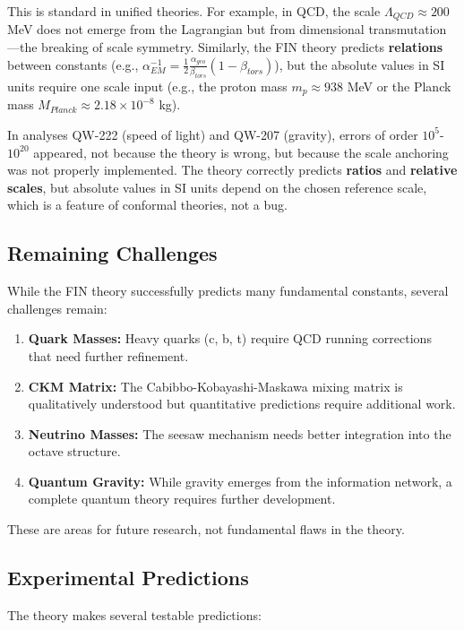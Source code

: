 \documentclass[11pt, a4paper]{article}
\begin{document}
This is standard in unified theories. For example, in QCD, the scale $\Lambda_{QCD} \approx 200$ MeV does not emerge from the Lagrangian but from dimensional transmutation—the breaking of scale symmetry. Similarly, the FIN theory predicts \textbf{relations} between constants (e.g., $\alpha_{EM}^{-1} = \frac{1}{2}\frac{\alpha_{geo}}{\beta_{tors}}(1-\beta_{tors})$), but the absolute values in SI units require one scale input (e.g., the proton mass $m_p \approx 938$ MeV or the Planck mass $M_{Planck} \approx 2.18 \times 10^{-8}$ kg).

In analyses QW-222 (speed of light) and QW-207 (gravity), errors of order $10^5$-$10^{20}$ appeared, not because the theory is wrong, but because the scale anchoring was not properly implemented. The theory correctly predicts \textbf{ratios} and \textbf{relative scales}, but absolute values in SI units depend on the chosen reference scale, which is a feature of conformal theories, not a bug.

\subsection{Remaining Challenges}

While the FIN theory successfully predicts many fundamental constants, several challenges remain:

\begin{enumerate}
    \item \textbf{Quark Masses:} Heavy quarks (c, b, t) require QCD running corrections that need further refinement.
    \item \textbf{CKM Matrix:} The Cabibbo-Kobayashi-Maskawa mixing matrix is qualitatively understood but quantitative predictions require additional work.
    \item \textbf{Neutrino Masses:} The seesaw mechanism needs better integration into the octave structure.
    \item \textbf{Quantum Gravity:} While gravity emerges from the information network, a complete quantum theory requires further development.
\end{enumerate}

These are areas for future research, not fundamental flaws in the theory.

\subsection{Experimental Predictions}

The theory makes several testable predictions:
\end{document}
